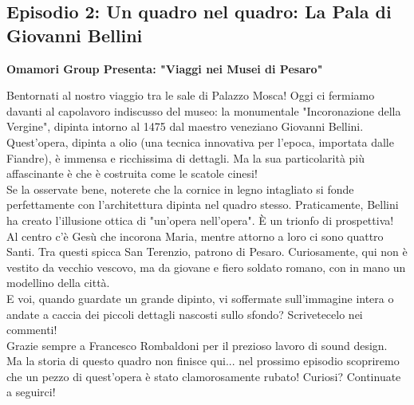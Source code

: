 \documentclass[hidelinks,12pt,a4paper]{article}
\begin{document}
\begin{flushleft}
		\subsection{Episodio 2: Un quadro nel quadro: La Pala di Giovanni Bellini}
		\begin{center}
			\textbf{Omamori Group Presenta: "Viaggi nei Musei di Pesaro"}
		\end{center}
		Bentornati al nostro viaggio tra le sale di Palazzo Mosca! Oggi ci fermiamo davanti al capolavoro indiscusso del museo: la monumentale "Incoronazione della Vergine", dipinta intorno al 1475 dal maestro veneziano Giovanni Bellini.\\
		Quest'opera, dipinta a olio (una tecnica innovativa per l'epoca, importata dalle Fiandre), è immensa e ricchissima di dettagli. Ma la sua particolarità più affascinante è che è costruita come le scatole cinesi!\\
		Se la osservate bene, noterete che la cornice in legno intagliato si fonde perfettamente con l'architettura dipinta nel quadro stesso. Praticamente, Bellini ha creato l'illusione ottica di "un'opera nell'opera". È un trionfo di prospettiva!\\
		Al centro c'è Gesù che incorona Maria, mentre attorno a loro ci sono quattro Santi. Tra questi spicca San Terenzio, patrono di Pesaro. Curiosamente, qui non è vestito da vecchio vescovo, ma da giovane e fiero soldato romano, con in mano un modellino della città.\\
		E voi, quando guardate un grande dipinto, vi soffermate sull'immagine intera o andate a caccia dei piccoli dettagli nascosti sullo sfondo? Scrivetecelo nei commenti!\\
		Grazie sempre a Francesco Rombaldoni per il prezioso lavoro di sound design.\\
		Ma la storia di questo quadro non finisce qui... nel prossimo episodio scopriremo che un pezzo di quest'opera è stato clamorosamente rubato! Curiosi? Continuate a seguirci!\\
		

\end{flushleft}
\end{document}

